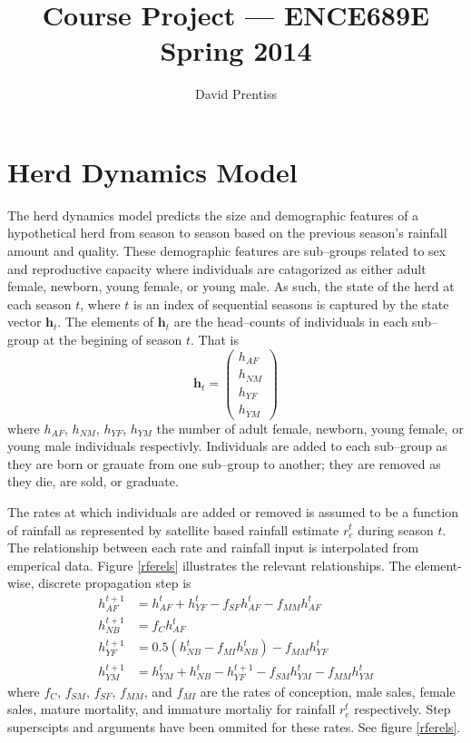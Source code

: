 \documentclass[letterpaper]{tufte-handout}
\title{Course Project --- ENCE689E Spring 2014}
\author{David Prentiss}
\newcommand{\vech}{\mathbf{h}}
\begin{document}
\maketitle

\section{Herd Dynamics Model}
The herd dynamics model predicts the size and demographic features of a hypothetical herd from season to season based on the previous season's rainfall amount and quality.
These demographic features are sub--groups related to sex and reproductive capacity where individuals are catagorized as either adult female, newborn, young female, or young male.
As such, the state of the herd at each season $t$, where $t$ is an index of sequential seasons is captured by the state vector $\vech_t$.
The elements of $\vech_t$ are the head--counts of individuals in each sub--group at the begining of season $t$.
That is
\begin{equation}
\vech_t = \begin{pmatrix} h_{AF} \\ h_{NM} \\ h_{YF} \\ h_{YM} \end{pmatrix}
\end{equation}
where $h_{AF}$, $h_{NM}$, $h_{YF}$, $h_{YM}$ the number of adult female, newborn, young female, or young male individuals respectivly. Individuals are added to each sub--group as they are born or grauate from one sub--group to another; they are removed as they die, are sold, or graduate.

The rates at which individuals are added or removed is assumed to be a function of rainfall as represented by satellite based rainfall estimate $r_e^t$ during season $t$. The relationship between each rate and rainfall input is interpolated from emperical data. Figure \ref{rferels} illustrates the relevant relationships. The element-wise, discrete propagation step is
\begin{align}
h_{AF}^{t+1} &= h_{AF}^t + h_{YF}^t - f_{SF}h_{AF}^t - f_{MM}h_{AF}^t \\
h_{NB}^{t+1} &= f_{C}h_{AF}^t \\
h_{YF}^{t+1} &= 0.5(h_{NB}^t - f_{MI}h_{NB}^t) - f_{MM}h_{YF}^t \\
h_{YM}^{t+1} &= h_{YM}^t + h_{NB}^t - h_{YF}^{t+1} - f_{SM}h_{YM}^t - f_{MM}h_{YM}^t
\end{align}
where $f_{C}$, $f_{SM}$, $f_{SF}$, $f_{MM}$, and $f_{MI}$ are the rates of conception, male sales, female sales, mature mortality, and immature mortaliy for rainfall $r^t_e$ respectively. Step superscipts and arguments have been ommited for these rates.
See figure \ref{rferels}.
\end{document}
